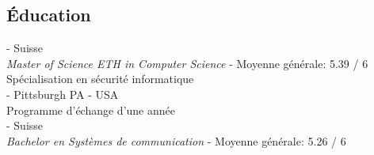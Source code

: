 \documentclass[mm, 11pt]{simple_style}
\begin{document}
\begin{resume}
\section{\'Education}
 - Suisse \\
{\sl Master of Science ETH in Computer Science} - Moyenne générale: 5.39 / 6\\
Sp\'ecialisation en s\'ecurit\'e informatique\\
 - Pittsburgh PA - USA \\
Programme d'\'echange d'une ann\'ee\\
 - Suisse  \\
{\sl Bachelor en Syst\`emes de communication} - Moyenne g\'en\'erale: 5.26 / 6\\
\sectionline

\end{resume}
\end{document}
